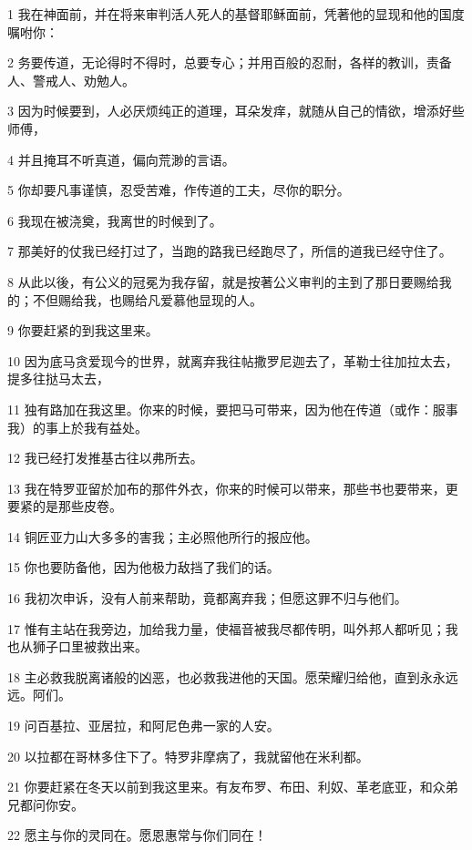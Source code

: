\par 1 我在神面前，并在将来审判活人死人的基督耶稣面前，凭著他的显现和他的国度嘱咐你：
\par 2 务要传道，无论得时不得时，总要专心；并用百般的忍耐，各样的教训，责备人、警戒人、劝勉人。
\par 3 因为时候要到，人必厌烦纯正的道理，耳朵发痒，就随从自己的情欲，增添好些师傅，
\par 4 并且掩耳不听真道，偏向荒渺的言语。
\par 5 你却要凡事谨慎，忍受苦难，作传道的工夫，尽你的职分。
\par 6 我现在被浇奠，我离世的时候到了。
\par 7 那美好的仗我已经打过了，当跑的路我已经跑尽了，所信的道我已经守住了。
\par 8 从此以後，有公义的冠冕为我存留，就是按著公义审判的主到了那日要赐给我的；不但赐给我，也赐给凡爱慕他显现的人。
\par 9 你要赶紧的到我这里来。
\par 10 因为底马贪爱现今的世界，就离弃我往帖撒罗尼迦去了，革勒士往加拉太去，提多往挞马太去，
\par 11 独有路加在我这里。你来的时候，要把马可带来，因为他在传道（或作：服事我）的事上於我有益处。
\par 12 我已经打发推基古往以弗所去。
\par 13 我在特罗亚留於加布的那件外衣，你来的时候可以带来，那些书也要带来，更要紧的是那些皮卷。
\par 14 铜匠亚力山大多多的害我；主必照他所行的报应他。
\par 15 你也要防备他，因为他极力敌挡了我们的话。
\par 16 我初次申诉，没有人前来帮助，竟都离弃我；但愿这罪不归与他们。
\par 17 惟有主站在我旁边，加给我力量，使福音被我尽都传明，叫外邦人都听见；我也从狮子口里被救出来。
\par 18 主必救我脱离诸般的凶恶，也必救我进他的天国。愿荣耀归给他，直到永永远远。阿们。
\par 19 问百基拉、亚居拉，和阿尼色弗一家的人安。
\par 20 以拉都在哥林多住下了。特罗非摩病了，我就留他在米利都。
\par 21 你要赶紧在冬天以前到我这里来。有友布罗、布田、利奴、革老底亚，和众弟兄都问你安。
\par 22 愿主与你的灵同在。愿恩惠常与你们同在！


